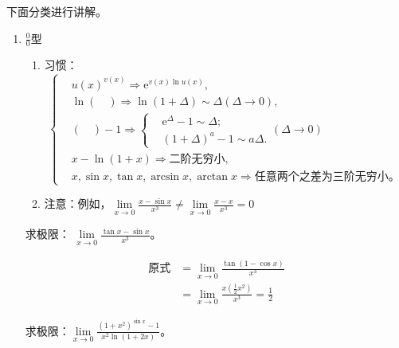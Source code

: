         下面分类进行讲解。
        \begin{enumerate}
            \item $ \displaystyle\frac{0}{0} $型
            
            \begin{enumerate}
                \item 习惯：    
                    \[ \left\{
                        \begin{array}{rl}
                            & u(x)^{v(x)}  \Rightarrow \mathrm{e}^{v(x)\ln u(x)},\\
                            & \ln {(\quad )}   \Rightarrow \ln{(1+\Delta)} \sim \Delta(\Delta \to 0),\\
                            & (\quad)-1  \Rightarrow \left\{ \begin{array}{rl} & \mathrm{e}^{\Delta}-1  \sim \Delta;\\
                                & (1+\Delta)^a-1  \sim a\Delta.
                            \end{array} \right. (\Delta \to 0)\\
                            & x-\ln (1+x) \Rightarrow \text{二阶无穷小},\\
                            & x,\sin x,\tan x, \arcsin x, \arctan x \Rightarrow \text{任意两个之差为三阶无穷小}。
                        \end{array} \right. \]
                \item 注意：例如，$\lim\limits_{x \to 0} \displaystyle\frac{x-\sin x}{x^3} \neq \lim\limits_{x \to 0} \displaystyle\frac{x-x}{x^3}=0$
            \end{enumerate}

            \begin{example}
              求极限： $ \lim\limits_{x\to 0} \displaystyle\frac{\tan x-\sin x}{x^3}$。
            \end{example}
            
            \begin{solution}
                \begin{align*}
                   \text{原式}
                   &=\lim_{x \to 0}\frac{\tan(1-\cos x)}{x^3}\\
                    &=\lim_{x \to 0}\frac{x(\frac{1}{2}x^2)}{x^3}=\frac{1}{2}
                \end{align*}
            \end{solution}

            \begin{example}
                求极限：$\lim\limits_{x \to 0} \displaystyle\frac{(1+x^2)^{\sin x}-1}{x^2 \ln (1+2x)}$。
            \end{example}


\end{enumerate}
